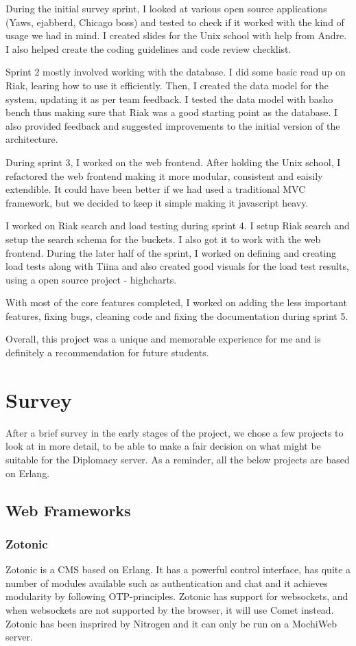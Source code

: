\documentclass[11pt,a4paper]{report}
\begin{document}
During the initial survey sprint, I looked at various open source applications (Yaws, ejabberd, Chicago boss) and tested to check if it worked with the kind of usage we had in mind. I created slides for the Unix school with help from Andre. I also helped create the coding guidelines and code review checklist.

Sprint 2 mostly involved working with the database. I did some basic read up on Riak, learing how to use it efficiently. Then, I created the data model for the system, updating it as per team feedback. I tested the data model with basho bench thus making sure that Riak was a good starting point as the database. I also provided feedback and suggested improvements to the initial version of the architecture.

During sprint 3, I worked on the web frontend. After holding the Unix school, I refactored the web frontend making it more modular, consistent and eaisily extendible. It could have been better if we had used a traditional MVC framework, but we decided to keep it simple making it javascript heavy.

I worked on Riak search and load testing during sprint 4. I setup Riak search and setup the search schema for the buckets. I also got it to work with the web frontend. During the later half of the sprint, I worked on defining and creating load tests along with Tiina and also created good visuals for the load test results, using a open source project - highcharts.

With most of the core features completed, I worked on adding the less important features, fixing bugs, cleaning code and fixing the documentation during sprint 5.

Overall, this project was a unique and memorable experience for me and is definitely a recommendation for future students.

\chapter{Survey}
After a brief survey in the early stages of the project, we chose a few projects to look at in more detail, to be able to make a fair decision on what might be suitable for the Diplomacy server. As a reminder, all the below projects are based on Erlang.

\section{Web Frameworks}
\subsection{Zotonic}
Zotonic\cite{zotonic} is a CMS based on Erlang. It has a powerful control interface, has
quite a number of modules available such as authentication and chat and it
achieves modularity by following OTP-principles. Zotonic has support for
websockets, and when websockets are not supported by the browser, it will use
Comet instead. Zotonic has been insprired by Nitrogen and it can only be run
on a MochiWeb server.
\end{document}

